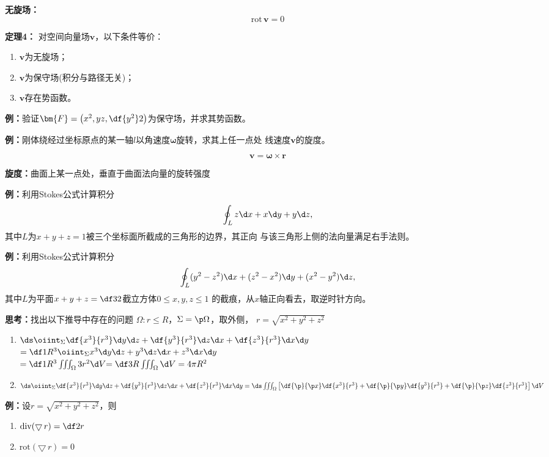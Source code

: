 {\bf 无旋场：}
$${\mathrm{rot}\,\bm{v}=0}$$ 

{\bf 定理4：}
对空间向量场$\bm{v}$，以下条件等价： 
\begin{enumerate}[(1)]
  \setlength{\itemindent}{1cm}
  \item $\bm{v}$为无旋场； 
  \item $\bm{v}$为保守场(积分与路径无关)； 
  \item $\bm{v}$存在势函数。
\end{enumerate}

{\bf 例：}验证$\bm{F}=\left(x^2,yz,\df{y^2}2\right)$为保守场，并求其势函数。

{\bf 例：}刚体绕经过坐标原点的某一轴$l$以角速度$\bm{\omega}$旋转，求其上任一点处
线速度$\bm{v}$的旋度。

$${\bm{v}=\bm{\omega}\times\bm{r}}$$

{\bf 旋度：}曲面上某一点处，垂直于曲面法向量的旋转强度

{\bf 例：}利用Stokes公式计算积分
$$\oint_Lz\d x+x\d y+y\d z,$$
其中$L$为$x+y+z=1$被三个坐标面所截成的三角形的边界，其正向
与该三角形上侧的法向量满足右手法则。

{\bf 例：}利用Stokes公式计算积分
$$\oint_L(y^2-z^2)\d x+(z^2-x^2)\d y+(x^2-y^2)\d z,$$
其中$L$为平面$x+y+z=\df 32$截立方体$0\leq x,y,z\leq 1$
的截痕，从$x$轴正向看去，取逆时针方向。

{\bf 思考：}找出以下推导中存在的问题
$\Omega:r\leq R$，$\Sigma=\p\Omega$，取外侧，
$r=\sqrt{x^2+y^2+z^2}$
\begin{enumerate}[(1)]
  \setlength{\itemindent}{1cm}
  \item
  $\ds\oiint_{\Sigma}\df{x^3}{r^3}\d
  y\d z+\df{y^3}{r^3}\d z\d x+\df{z^3}{r^3}\d x\d y$\\ 
  \hspace{2cm}$=\df 1{R^3}\oiint_{\Sigma}x^3\d y\d z+y^3\d z\d x+z^3\d x\d y$\\ 
  \hspace{2cm}$=\df 1{R^3}\iiint_{\Omega}3r^2\d V{=\df
  3R\iiint_{\Omega}\d V} =4\pi R^2$
  \item
  $\ds\oiint_{\Sigma}\df{x^3}{r^3}\d
  y\d z+\df{y^3}{r^3}\d z\d x+\df{z^3}{r^3}\d x\d y
  =\ds\iiint_{\Omega}\left[\df{\p}{\p x}\df{x^3}{r^3}+\df{\p}{\p
  y}\df{y^3}{r^3}+\df{\p}{\p
  z}\df{z^3}{r^3}\right]\d V$
\end{enumerate}

{\bf 例：}设$r=\sqrt{x^2+y^2+z^2}$，则
\begin{enumerate}[(1)]
  \setlength{\itemindent}{1cm}
  \item $\mathrm{div}(\bigtriangledown\,r)=\df 2r$
  \item $\mathrm{rot}(\bigtriangledown\,r)=0$
\end{enumerate}

